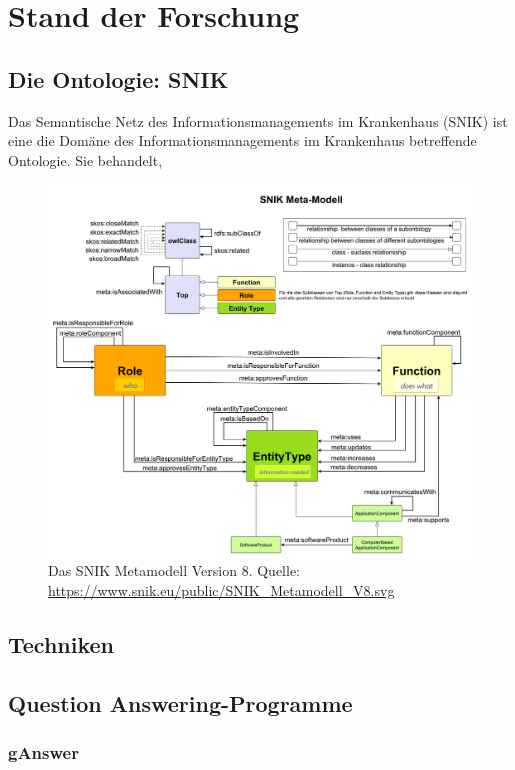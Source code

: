\chapter{Stand der Forschung}\label{ch:relatedWork}

\section{Die Ontologie: SNIK}

Das Semantische Netz des Informationsmanagements im Krankenhaus (SNIK) ist eine die Domäne des Informationsmanagements im Krankenhaus betreffende Ontologie.
Sie behandelt,

\begin{figure}
\centering
\includegraphics[width=.8\textwidth, height=.9\textheight, keepaspectratio]{Images/snik-metamodel.pdf}
\caption[SNIK Metamodell Version 8]{Das SNIK Metamodell Version 8. Quelle: \url{https://www.snik.eu/public/SNIK_Metamodell_V8.svg}}
\label{fig:snik-metamodel}
\end{figure}

\section{Techniken}


\section{Question Answering-Programme}

\subsection{gAnswer}
